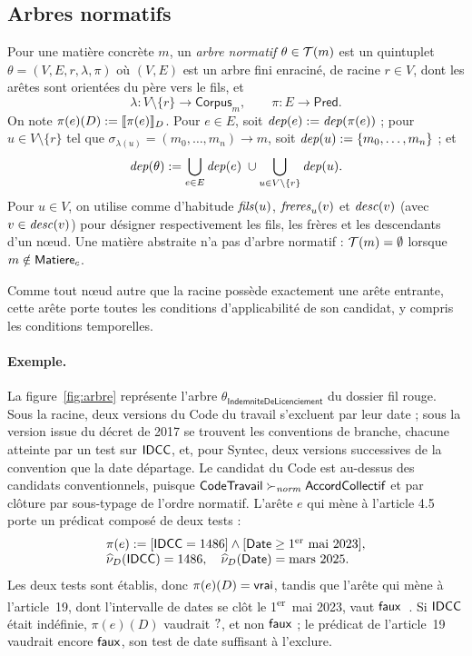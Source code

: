 \documentclass[review]{jflart}
\newcommand{\Pred}{\ensuremath{\mathsf{Pred}}}
\renewcommand{\Indem}{\ensuremath{\mathsf{IndemniteDeLicenciement}}}
\renewcommand{\Cand}{\ensuremath{\mathsf{Corpus}}}
\begin{document}
\subsection{Arbres normatifs}

\begin{defi}\label{def:normative-tree}
Pour une matière concrète \(m\), un \emph{arbre normatif} \(\theta\in\mathcal{T}(m)\) est un
quintuplet \(\theta=(V,E,r,\lambda,\pi)\) où \((V,E)\) est un arbre fini
enraciné, de racine \(r\in V\), dont les arêtes sont orientées du père vers
le fils, et
\[
 \lambda:V\setminus\{r\}\to\Cand_m,\qquad
 \pi:E\to\Pred.
\]
On note \(\pi(e)(D):=\llbracket \pi(e)\rrbracket_D\). Pour \(e\in E\), soit
\(\mathit{dep}(e):=\mathit{dep}(\pi(e))\) ; pour \(u\in V\setminus\{r\}\) tel que
\(\sigma_{\lambda(u)}=(m_0,\ldots,m_n)\to m\), soit
\(\mathit{dep}(u):=\{m_0,\ldots,m_n\}\) ; et
\[
 \mathit{dep}(\theta):=\bigcup_{e\in E}\mathit{dep}(e)\;\cup
                      \bigcup_{u\in V\setminus\{r\}}\mathit{dep}(u).
\]
Pour \(u\in V\), on utilise comme d'habitude \(\mathit{fils}(u)\), \(\mathit{freres}_u(v)\) et
\(\mathit{desc}(v)\) (avec \(v\in\mathit{desc}(v)\)) pour désigner respectivement les fils, les
frères et les descendants d'un nœud. Une matière abstraite n'a pas d'arbre
normatif : \(\mathcal{T}(m)=\emptyset\) lorsque \(m\notin\mathsf{Matiere}_c\).
\end{defi}

Comme tout nœud autre que la racine possède exactement une arête entrante,
cette arête porte toutes les conditions d'applicabilité de son candidat, y
compris les conditions temporelles.

\paragraph{Exemple.} La figure~\ref{fig:arbre} représente l'arbre
\(\theta_{\Indem}\) du dossier fil rouge. Sous la racine, deux versions du Code
du travail s'excluent par leur date ; sous la version issue du décret de 2017
se trouvent les conventions de branche, chacune atteinte par un test sur
\(\mathsf{IDCC}\), et, pour Syntec, deux versions successives de la convention que la
date départage. Le candidat du Code est au-dessus des candidats conventionnels,
puisque \(\mathsf{CodeTravail}\succ_{\mathit{norm}}\mathsf{AccordCollectif}\) et par clôture par sous-typage
de l'ordre normatif. L'arête \(e\) qui mène à l'article 4.5 porte un prédicat
composé de deux tests :
\[
\begin{array}{l}
 \pi(e):=[\mathsf{IDCC}=1486]\land[\mathsf{Date}\geq\text{1\textsuperscript{er} mai 2023}],\\
 \widehat \nu_D(\mathsf{IDCC})= 1486,\quad
 \widehat \nu_D(\mathsf{Date})=\text{mars 2025}.
\end{array}
\]
Les deux tests sont établis, donc \(\pi(e)(D)=\mathsf{vrai}\), tandis que l'arête qui
mène à l'article~19, dont l'intervalle de dates se clôt le
1\textsuperscript{er}~mai 2023, vaut \(\mathsf{faux}\)~\cite{frcode,syntec}. Si
\(\mathsf{IDCC}\) était indéfinie, \(\pi(e)(D)\) vaudrait \(\mathord{?}\), et non
\(\mathsf{faux}\) ; le prédicat de l'article~19 vaudrait encore \(\mathsf{faux}\), son test
de date suffisant à l'exclure.
\end{document}

